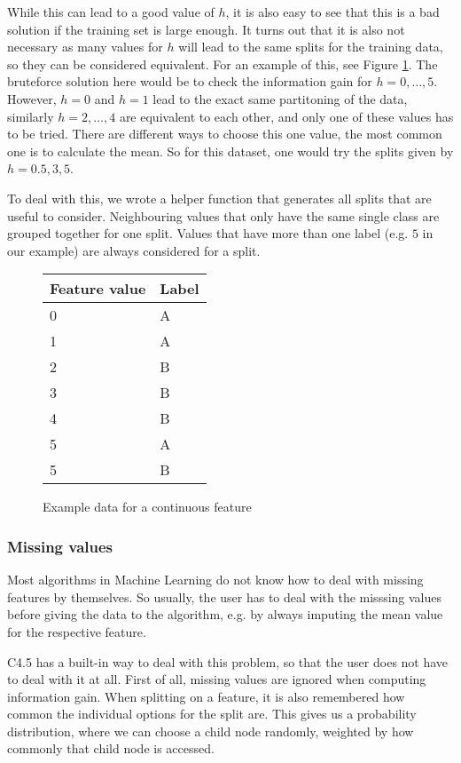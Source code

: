 \documentclass[a4paper]{article}
\begin{document}
While this can lead to a good value of $h$, it is also easy to see that this is a bad solution if the training set is large enough. It turns out that it is also not necessary as many values for $h$ will lead to the same splits for the training data, so they can be considered equivalent. For an example of this, see Figure \ref{fig:continuous-feature}. The bruteforce solution here would be to check the information gain for $h = 0, \dots, 5$. However, $h = 0$ and $h = 1$ lead to the exact same partitoning of the data, similarly $h = 2, \dots, 4$ are equivalent to each other, and only one of these values has to be tried. There are different ways to choose this one value, the most common one is to calculate the mean. So for this dataset, one would try the splits given by $h = 0.5, 3, 5$.

To deal with this, we wrote a helper function that generates all splits that are useful to consider. Neighbouring values that only have the same single class are grouped together for one split. Values that have more than one label (e.g. $5$ in our example) are always considered for a split.

\begin{figure}
	\centering
  \begin{tabular}{l|l}
      \textbf{Feature value} & \textbf{Label} \\
      \hline
      0 & A \\
      1 & A \\
      2 & B \\
      3 & B \\
      4 & B \\
      5 & A \\
      5 & B
  \end{tabular}

  \caption{Example data for a continuous feature}
  \label{fig:continuous-feature}
\end{figure}

\subsubsection{Missing values}

Most algorithms in Machine Learning do not know how to deal with missing features by themselves. So usually, the user has to deal with the misssing values before giving the data to the algorithm, e.g. by always imputing the mean value for the respective feature.

C4.5 has a built-in way to deal with this problem, so that the user does not have to deal with it at all. First of all, missing values are ignored when computing information gain. When splitting on a feature, it is also remembered how common the individual options for the split are. This gives us a probability distribution, where we can choose a child node randomly, weighted by how commonly that child node is accessed.
\end{document}

